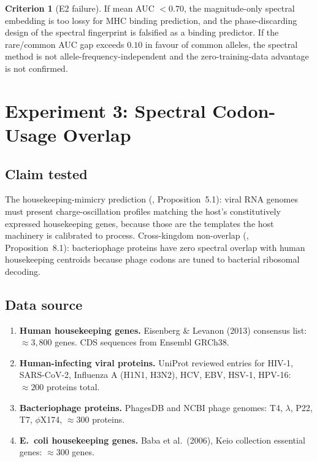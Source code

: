 \documentclass[11pt,a4paper]{article}
\theoremstyle{expthm}
\theoremstyle{definition}
\newtheorem{criterion}[theorem]{Criterion}
\theoremstyle{remark}
\begin{document}
\begin{criterion}[E2 failure]
\label{crit:e2-failure}
If mean AUC $< 0.70$, the magnitude-only spectral embedding is too
lossy for MHC binding prediction, and the phase-discarding design of the
spectral fingerprint is falsified as a binding predictor. If the rare/common
AUC gap exceeds $0.10$ in favour of common alleles, the spectral method
is not allele-frequency-independent and the zero-training-data advantage
is not confirmed.
\end{criterion}

\section{Experiment 3: Spectral Codon-Usage Overlap}
\label{sec:exp3}

\subsection{Claim tested}

The housekeeping-mimicry prediction
(\citep{sachikonye2026viral}, Proposition~5.1): viral RNA genomes must
present charge-oscillation profiles matching the host's constitutively
expressed housekeeping genes, because those are the templates the host
machinery is calibrated to process. Cross-kingdom non-overlap
(\citep{sachikonye2026viral}, Proposition~8.1): bacteriophage proteins
have zero spectral overlap with human housekeeping centroids because
phage codons are tuned to bacterial ribosomal decoding.

\subsection{Data source}

\begin{enumerate}[leftmargin=1.4em,itemsep=2pt]
\item \textbf{Human housekeeping genes.} Eisenberg \& Levanon (2013)
  consensus list: $\approx 3{,}800$ genes. CDS sequences from Ensembl
  GRCh38.
\item \textbf{Human-infecting viral proteins.} UniProt reviewed entries
  for HIV-1, SARS-CoV-2, Influenza A (H1N1, H3N2), HCV, EBV, HSV-1,
  HPV-16: $\approx 200$ proteins total.
\item \textbf{Bacteriophage proteins.} PhagesDB and NCBI phage genomes:
  T4, $\lambda$, P22, T7, $\phi$X174, $\approx 300$ proteins.
\item \textbf{E.\ coli housekeeping genes.} Baba et al.\ (2006), Keio
  collection essential genes: $\approx 300$ genes.
\end{enumerate}
\end{document}
